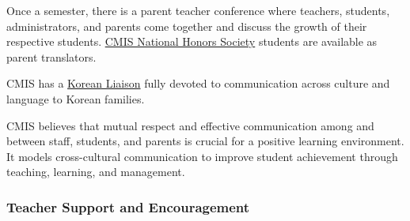 \begin{findings}
Once a semester, there is a parent teacher conference where teachers, students, administrators, and parents come together and discuss the growth of their respective students. \href{https://docs.google.com/a/cmis.ac.th/document/d/1XA31w9WsFCzB3k9LcQnU46sTUmMeEiObDQ8yOqCPZdU/edit?usp=sharing}{CMIS National Honors Society} students are available as parent translators.

CMIS has a \href{https://docs.google.com/a/cmis.ac.th/document/d/1yZyHuHhAg7tHITOtlZQdX_w4kinRwL6J_Y_zco_7jSE/edit?usp=sharing}{Korean Liaison} fully devoted to communication across culture and language to Korean families.


CMIS believes that mutual respect and effective communication among and between staff, students, and parents is crucial for a positive learning environment. It models cross-cultural communication to improve student achievement through teaching, learning, and management.
\end{findings}

\subsubsection{Teacher Support and Encouragement}



